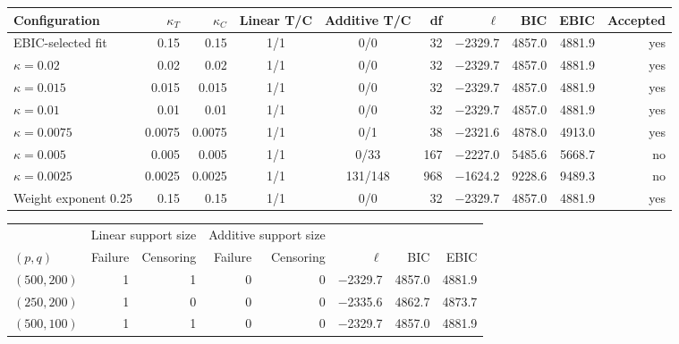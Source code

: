 \begin{table}[!htbp]
\centering

\label{tab:luad-corrected-additive-audit}
\scriptsize
\setlength{\tabcolsep}{2.8pt}
\begin{tabular}{lrrccrrrrr}
\toprule
Configuration & $\kappa_T$ & $\kappa_C$ & Linear T/C & Additive T/C & df & $\ell$ & BIC & EBIC & Accepted\\
\midrule
EBIC-selected fit & 0.15 & 0.15 & 1/1 & 0/0 & 32 & $-$2329.7 & 4857.0 & 4881.9 & yes \\
$\kappa=0.02$ & 0.02 & 0.02 & 1/1 & 0/0 & 32 & $-$2329.7 & 4857.0 & 4881.9 & yes \\
$\kappa=0.015$ & 0.015 & 0.015 & 1/1 & 0/0 & 32 & $-$2329.7 & 4857.0 & 4881.9 & yes \\
$\kappa=0.01$ & 0.01 & 0.01 & 1/1 & 0/0 & 32 & $-$2329.7 & 4857.0 & 4881.9 & yes \\
$\kappa=0.0075$ & 0.0075 & 0.0075 & 1/1 & 0/1 & 38 & $-$2321.6 & 4878.0 & 4913.0 & yes \\
$\kappa=0.005$ & 0.005 & 0.005 & 1/1 & 0/33 & 167 & $-$2227.0 & 5485.6 & 5668.7 & no \\
$\kappa=0.0025$ & 0.0025 & 0.0025 & 1/1 & 131/148 & 968 & $-$1624.2 & 9228.6 & 9489.3 & no \\
Weight exponent 0.25 & 0.15 & 0.15 & 1/1 & 0/0 & 32 & $-$2329.7 & 4857.0 & 4881.9 & yes \\
\bottomrule
\end{tabular}
\end{table}

\begin{table}[!htbp]
\centering

\label{tab:luad-dimension-audit}
\small
\setlength{\tabcolsep}{4pt}
\begin{tabular}{lrrrrrrr}
\toprule
& \multicolumn{2}{c}{Linear support size} & \multicolumn{2}{c}{Additive support size} & & & \\
\cmidrule(lr){2-3}\cmidrule(lr){4-5}
$(p,q)$ & Failure & Censoring & Failure & Censoring & $\ell$ & BIC & EBIC\\
\midrule
$(500,200)$ & 1 & 1 & 0 & 0 & $-$2329.7 & 4857.0 & 4881.9 \\
$(250,200)$ & 1 & 0 & 0 & 0 & $-$2335.6 & 4862.7 & 4873.7 \\
$(500,100)$ & 1 & 1 & 0 & 0 & $-$2329.7 & 4857.0 & 4881.9 \\
\bottomrule
\end{tabular}
\end{table}

